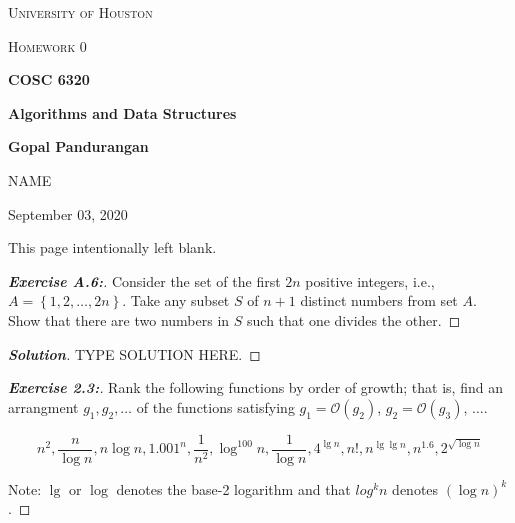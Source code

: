 \documentclass[a4paper]{article}
\newenvironment{solution}{\begin{proof}[\textnormal{\textbf{Solution}}]}{\end{proof}}
\newenvironment{exercise}[1]{\begin{proof}[\textnormal{\textbf{Exercise #1:}}]\renewcommand{\qedsymbol}{}}{\end{proof}}
\newcommand{\bigO}[1]{\mathcal{O}\left(#1\right)}
\newcommand{\set}[1]{\left\lbrace#1\right\rbrace}
\begin{document}
\begin{titlepage}
    \centering
    {\scshape\LARGE University of Houston\par}
    \vspace{1cm}
    {\scshape\Large Homework 0 \par}
    \vspace{1.5cm}
    {\huge\bfseries COSC 6320 \par}
    {\huge\bfseries Algorithms and Data Structures \par}
    \vspace{0.5cm}
    {\large\bfseries Gopal Pandurangan\par}
    \vspace{2cm}
    {\Large NAME\par}
    \vspace{0.5cm}
    {\large \par} September 03, 2020
    \vfill

\end{titlepage}
\vspace*{\fill}\begin{center}{\Huge This page intentionally left blank.}\end{center}\vspace*{\fill}\thispagestyle{empty}\clearpage
{}

\begin{exercise}{A.6}
    Consider the set of the first \(2n\) positive integers, i.e., \(A = \set{1, 2, \hdots, 2n}\). Take any subset \(S\) of \(n + 1\) distinct numbers from set \(A\). Show that there are two numbers in \(S\) such that one divides the other.
\end{exercise}

\begin{solution}
    TYPE SOLUTION HERE.
\end{solution}

\begin{exercise}{2.3}
    Rank the following functions by order of growth; that is, find an arrangment \(g_1, g_2, \hdots\) of the functions satisfying \(g_1 = \bigO{g_2}\), \(g_2 = \bigO{g_3}\), \(\hdots\).

    \[n^2, \frac{n}{\log{n}}, n\log{n}, 1.001^n, \frac{1}{n^2}, \log^{100}{n}, \frac{1}{\log{n}}, 4^{\lg{n}}, n!, n^{\lg{\lg{n}}}, n^{1.6}, 2^{\sqrt{\log{n}}}\]

    Note: \(\lg\) or \(\log\) denotes the base-2 logarithm and that \(log^k{n}\) denotes \((\log{n})^k\).
\end{exercise}
\end{document}
